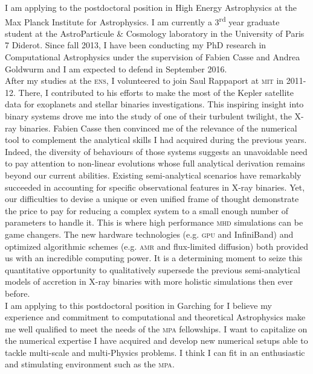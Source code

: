 \documentclass[12pt]{letter}
\begin{document}
\begin{letter} {}
\hspace*{0.5cm} I am applying to the postdoctoral position in High Energy Astrophysics at the Max Planck Institute for Astrophysics. I am currently a 3\textsuperscript{rd} year graduate student at the AstroParticule \& Cosmology laboratory in the University of Paris 7 Diderot. Since fall 2013, I have been conducting my PhD research in Computational Astrophysics under the supervision of Fabien Casse and Andrea Goldwurm and I am expected to defend in September 2016.\\
\hspace*{0.5cm} After my studies at the \textsc{ens}, I volunteered to join Saul Rappaport at \textsc{mit} in 2011-12. There, I contributed to his efforts to make the most of the Kepler satellite data for exoplanets and stellar binaries investigations. This inspiring insight into binary systems drove me into the study of one of their turbulent twilight, the X-ray binaries. Fabien Casse then convinced me of the relevance of the numerical tool to complement the analytical skills I had acquired during the previous years. Indeed, the diversity of behaviours of those systems suggests an unavoidable need to pay attention to non-linear evolutions whose full analytical derivation remains beyond our current abilities. Existing semi-analytical scenarios have remarkably succeeded in accounting for specific observational features in X-ray binaries. Yet, our difficulties to devise a unique or even unified frame of thought demonstrate the price to pay for reducing a complex system to a small enough number of parameters to handle it. This is where high performance \textsc{mhd} simulations can be game changers. The new hardware technologies (e.g. \textsc{gpu} and InfiniBand) and optimized algorithmic schemes (e.g. \textsc{amr} and flux-limited diffusion) both provided us with an incredible computing power. It is a determining moment to seize this quantitative opportunity to qualitatively supersede the previous semi-analytical models of accretion in X-ray binaries with more holistic simulations then ever before.\\
\hspace*{0.5cm} I am applying to this postdoctoral position in Garching for I believe my experience and commitment to computational and theoretical Astrophysics make me well qualified to meet the needs of the \textsc{mpa} fellowships. I want to capitalize on the numerical expertise I have acquired and develop new numerical setups able to tackle multi-scale and multi-Physics problems. I think I can fit in an enthusiastic and stimulating environment such as the \textsc{mpa}.\\

\end{letter}
\end{document}
